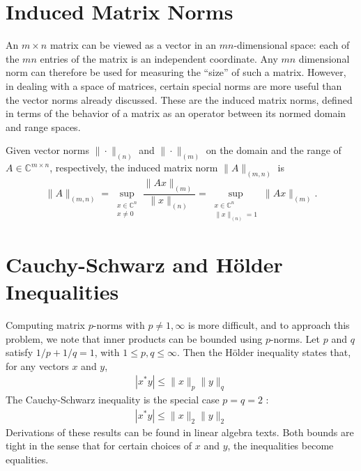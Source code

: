 \section{Induced Matrix Norms} 
An $m \times n$ matrix can be viewed as a vector in an $m n$-dimensional space: each of the $m n$ entries of the matrix is an independent coordinate. Any $m n$ dimensional norm can therefore be used for measuring the ``size'' of such a matrix. However, in dealing with a space of matrices, certain special norms are more useful than the vector norms already discussed. These are the induced matrix norms, defined in terms of the behavior of a matrix as an operator between its normed domain and range spaces. 

Given vector norms $\|\cdot\|_{(n)}$ and $\|\cdot\|_{(m)}$ on the domain and the range of $A \in \mathbb{C}^{m \times n}$, respectively, the induced matrix norm $\|A\|_{(m, n)}$ is
\[
    \|A\|_{(m, n)}=\sup _{\substack{x \in \mathbb{C}^n \\ x \neq 0}} \frac{\|A x\|_{(m)}}{\|x\|_{(n)}}=\sup _{\substack{x \in \mathbb{C}^n \\\|x\|_{(n)}=1}}\|A x\|_{(m)}. 
\]

\section{Cauchy-Schwarz and H\"older Inequalities} 
Computing matrix $p$-norms with $p \neq 1, \infty$ is more difficult, and to approach this problem, we note that inner products can be bounded using $p$-norms. Let $p$ and $q$ satisfy $1 / p+1 / q=1$, with $1 \leq p, q \leq \infty$. Then the Hölder inequality states that, for any vectors $x$ and $y$,
\begin{align}
    \label{eq: Holder}
\left|x^* y\right| \leq\|x\|_p\|y\|_q
\end{align}
The Cauchy-Schwarz inequality is the special case $p=q=2$ :
\begin{align}
    \label{eq: cauchy}
\left|x^* y\right| \leq\|x\|_2\|y\|_2
\end{align}
Derivations of these results can be found in linear algebra texts. Both bounds are tight in the sense that for certain choices of $x$ and $y$, the inequalities become equalities.

